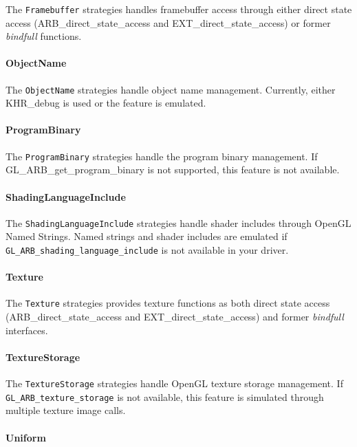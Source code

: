 \documentclass{article}
\begin{document}
The \lstinline|Framebuffer| strategies handles framebuffer access through either direct state access (ARB\_direct\_state\_access and EXT\_direct\_state\_access) or former \emph{bindfull} functions.

\paragraph{ObjectName}

The \lstinline|ObjectName| strategies handle object name management. Currently, either KHR\_debug is used or the feature is emulated.

\paragraph{ProgramBinary}

The \lstinline|ProgramBinary| strategies handle the program binary management. If GL\_ARB\_get\_program\_binary is not supported, this feature is not available.

\paragraph{ShadingLanguageInclude}

The \lstinline|ShadingLanguageInclude| strategies handle shader includes through OpenGL Named Strings. Named strings and shader includes are emulated if \lstinline|GL_ARB_shading_language_include| is not available in your driver.

\paragraph{Texture}

The \lstinline|Texture| strategies provides texture functions as both direct state access (ARB\_direct\_state\_access and EXT\_direct\_state\_access) and former \emph{bindfull} interfaces.

\paragraph{TextureStorage}

The \lstinline|TextureStorage| strategies handle OpenGL texture storage management. If \lstinline|GL_ARB_texture_storage| is not available, this feature is simulated through multiple texture image calls.

\paragraph{Uniform}
\end{document}
